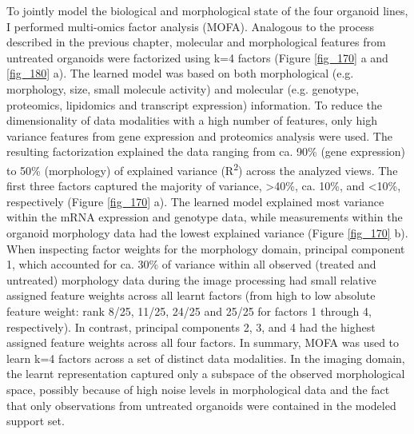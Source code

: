 \begin{flushleft}
To jointly model the biological and morphological state of the four organoid lines, I performed multi-omics factor analysis (MOFA). Analogous to the process described in the previous chapter, molecular and morphological features from untreated organoids were factorized using k=4 factors (Figure \ref{fig_170} a and \ref{fig_180} a). The learned model was based on both morphological (e.g. morphology, size, small molecule activity) and molecular (e.g. genotype, proteomics, lipidomics and transcript expression) information. To reduce the dimensionality of data modalities with a high number of features, only high variance features from gene expression and proteomics analysis were used. The resulting factorization explained the data ranging from ca. 90\% (gene expression) to 50\% (morphology) of explained variance (R\textsuperscript{2}) across the analyzed views. The first three factors captured the majority of variance, >40\%, ca. 10\%, and <10\%, respectively (Figure \ref{fig_170} a). The learned model explained most variance within the mRNA expression and genotype data, while measurements within the organoid morphology data had the lowest explained variance (Figure \ref{fig_170} b). When inspecting factor weights for the morphology domain, principal component 1, which accounted for ca. 30\% of variance within all observed (treated and untreated) morphology data during the image processing had small relative assigned feature weights across all learnt factors (from high to low absolute feature weight: rank 8/25, 11/25, 24/25 and 25/25 for factors 1 through 4, respectively). In contrast, principal components 2, 3, and 4 had the highest assigned feature weights across all four factors. In summary, MOFA was used to learn k=4 factors across a set of distinct data modalities. In the imaging domain, the learnt representation captured only a subspace of the observed morphological space, possibly because of high noise levels in morphological data and the fact that only observations from untreated organoids were contained in the modeled support set. 
\par


\end{flushleft}

